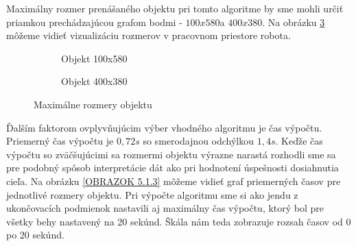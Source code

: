 Maximálny rozmer prenášaného objektu pri tomto algoritme by sme mohli určiť priamkou prechádzajúcou grafom bodmi - $ 100x580  $a $ 400x380 $. Na obrázku \ref{OBRAZOK 5.1.2} môžeme vidieť vizualizáciu rozmerov v pracovnom priestore robota.  
\begin{figure}[h]
	\centering
	\begin{subfigure}{0.4\textwidth}
		\centering
		\caption{Objekt 100x580} \label{OBRAZOK 5.1.2.1} 
	\end{subfigure}
	\begin{subfigure}{0.4\textwidth}
		\centering
		\caption{Objekt 400x380} \label{OBRAZOK 5.1.2.2}
	\end{subfigure}
\caption{Maximálne rozmery objektu}
\label{OBRAZOK 5.1.2} 
\end{figure} 

Ďalším faktorom ovplyvňujúcim výber vhodného algoritmu je čas výpočtu. Priemerný čas výpočtu je $ 0,72 s$ so smerodajnou odchýlkou $ 1,4 s$.  Keďže čas výpočtu so zväčšujúcimi sa rozmermi objektu výrazne narastá rozhodli sme sa pre podobný spôsob interpretácie dát ako pri hodnotení úspešnosti dosiahnutia cieľa. Na obrázku \ref{OBRAZOK 5.1.3} môžeme vidieť graf priemerných časov pre jednotlivé rozmery objektu. Pri výpočte algoritmu sme si ako jendu z ukončovacích  podmienok nastavili aj maximálny čas výpočtu, ktorý bol pre všetky behy nastavený na 20 sekúnd. Škála nám teda zobrazuje rozsah časov od 0 po 20 sekúnd. 

